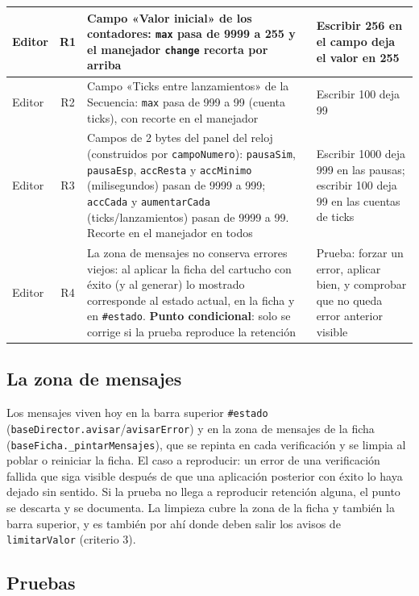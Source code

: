 \begin{xltabular}{\textwidth}{l c >{\RaggedRight\arraybackslash}X >{\RaggedRight\arraybackslash}X}
	\midrule
	Editor & R1 & Campo «Valor inicial» de los contadores: \texttt{max} pasa de 9999 a 255 y el manejador \texttt{change} recorta por arriba & Escribir 256 en el campo deja el valor en 255 \\
	\midrule
	Editor & R2 & Campo «Ticks entre lanzamientos» de la Secuencia: \texttt{max} pasa de 999 a 99 (cuenta ticks), con recorte en el manejador & Escribir 100 deja 99 \\
	\midrule
	Editor & R3 & Campos de 2 bytes del panel del reloj (construidos por \texttt{campoNumero}): \texttt{pausaSim}, \texttt{pausaEsp}, \texttt{accResta} y \texttt{accMinimo} (milisegundos) pasan de 9999 a 999; \texttt{accCada} y \texttt{aumentarCada} (ticks/lanzamientos) pasan de 9999 a 99. Recorte en el manejador en todos & Escribir 1000 deja 999 en las pausas; escribir 100 deja 99 en las cuentas de ticks \\
	\midrule
	Editor & R4 & La zona de mensajes no conserva errores viejos: al aplicar la ficha del cartucho con éxito (y al generar) lo mostrado corresponde al estado actual, en la ficha y en \texttt{\#estado}. \textbf{Punto condicional}: solo se corrige si la prueba reproduce la retención & Prueba: forzar un error, aplicar bien, y comprobar que no queda error anterior visible \\
	\bottomrule
\end{xltabular}


\subsection{La zona de mensajes}
\label{sec:F5I16Mensajes}

Los mensajes viven hoy en la barra superior \texttt{\#estado} (\texttt{baseDirector.avisar}/\texttt{avisarError}) y en la zona de mensajes de la ficha (\texttt{baseFicha.\_pintarMensajes}), que se repinta en cada verificación y se limpia al poblar o reiniciar la ficha. El caso a reproducir: un error de una verificación fallida que siga visible después de que una aplicación posterior con éxito lo haya dejado sin sentido. Si la prueba no llega a reproducir retención alguna, el punto se descarta y se documenta. La limpieza cubre la zona de la ficha y también la barra superior, y es también por ahí donde deben salir los avisos de \texttt{limitarValor} (criterio 3).

\subsection{Pruebas}
\label{sec:F5I16Pruebas}

